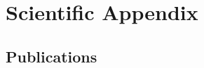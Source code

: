 \documentclass[]{friggeri-cv} %
\begin{document}
\let\thefootnote\relax{}

\newpage
\section{Scientific Appendix}

\subsection{Publications}
\nocite{*}
\printbibliography[title={\emptyset}]
\end{document}
